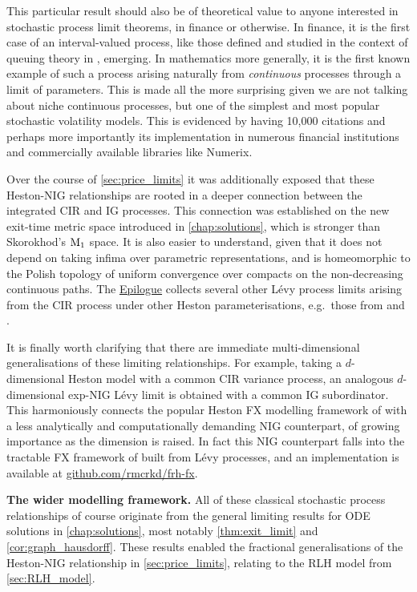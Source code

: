 This particular result should also be of theoretical value to anyone interested in stochastic process limit theorems, in finance or otherwise. In finance, it is the first case of an interval-valued process, like those defined and studied in the context of queuing theory in \cite{whitt_2002}, emerging. In mathematics more generally, it is the first known example of such a process arising naturally from \emph{continuous} processes through a limit of parameters. This is made all the more surprising given we are not talking about niche continuous processes, but one of the simplest and most popular stochastic volatility models. This is evidenced by \cite{heston_1993} having 10,000 citations and perhaps more importantly its implementation in numerous financial institutions and commercially available libraries like Numerix.

Over the course of \autoref{sec:price_limits} it was additionally exposed that these Heston-NIG relationships are rooted in a deeper connection between the integrated CIR and IG processes. This connection was established on the new exit-time metric space introduced in \autoref{chap:solutions}, which is stronger than Skorokhod's $\mathrm{M}_1$ space. It is also easier to understand, given that it does not depend on taking infima over parametric representations, and is homeomorphic to the Polish topology of uniform convergence over compacts on the non-decreasing continuous paths. The \hyperlink{epilogue}{Epilogue} collects several other L\'evy process limits arising from the CIR process under other Heston parameterisations, e.g.~those from \cite{heston_1993} and \cite{fouque_2011}.

It is finally worth clarifying that there are immediate multi-dimensional generalisations of these limiting relationships. For example, taking a $d$-dimensional Heston model with a common CIR variance process, an analogous $d$-dimensional exp-NIG L\'evy limit is obtained with a common IG subordinator. This harmoniously connects the popular Heston FX modelling framework of \cite{decol_2013} with a less analytically and computationally demanding NIG counterpart, of growing importance as the dimension is raised. In fact this NIG counterpart falls into the tractable FX framework of \cite{ballotta_2017} built from L\'evy processes, and an implementation is available at \href{https://github.com/rmcrkd/frh-fx}{github.com/rmcrkd/frh-fx}.

\vspace{3mm}\textbf{The wider modelling framework.} All of these classical stochastic process relationships of course originate from the general limiting results for ODE solutions in \autoref{chap:solutions}, most notably \autoref{thm:exit_limit} and \autoref{cor:graph_hausdorff}. These results enabled the fractional generalisations of the Heston-NIG relationship in \autoref{sec:price_limits}, relating to the RLH model from \autoref{sec:RLH_model}.

